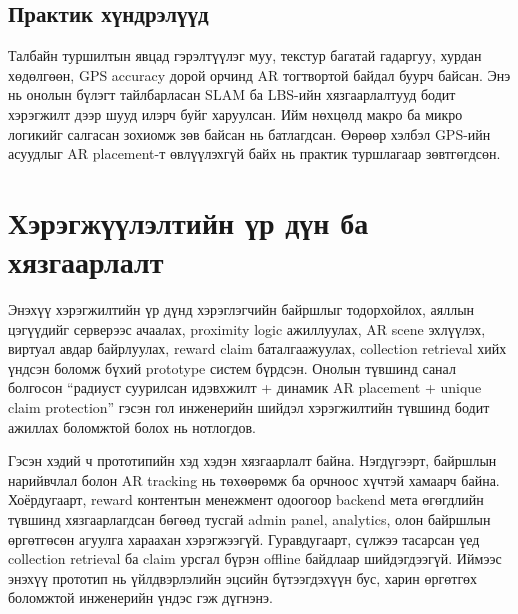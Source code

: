 \begin{sloppy}
\subsection{Практик хүндрэлүүд}

Талбайн туршилтын явцад гэрэлтүүлэг муу, текстур багатай гадаргуу, хурдан хөдөлгөөн, GPS accuracy дорой орчинд AR тогтвортой байдал буурч байсан. Энэ нь онолын бүлэгт тайлбарласан SLAM ба LBS-ийн хязгаарлалтууд бодит хэрэгжилт дээр шууд илэрч буйг харуулсан. Ийм нөхцөлд макро ба микро логикийг салгасан зохиомж зөв байсан нь батлагдсан. Өөрөөр хэлбэл GPS-ийн асуудлыг AR placement-т өвлүүлэхгүй байх нь практик туршлагаар зөвтгөгдсөн.

\section{Хэрэгжүүлэлтийн үр дүн ба хязгаарлалт}

Энэхүү хэрэгжилтийн үр дүнд хэрэглэгчийн байршлыг тодорхойлох, аяллын цэгүүдийг серверээс ачаалах, proximity logic ажиллуулах, AR scene эхлүүлэх, виртуал авдар байрлуулах, reward claim баталгаажуулах, collection retrieval хийх үндсэн боломж бүхий prototype систем бүрдсэн. Онолын түвшинд санал болгосон ``радиуст суурилсан идэвхжилт + динамик AR placement + unique claim protection'' гэсэн гол инженерийн шийдэл хэрэгжилтийн түвшинд бодит ажиллах боломжтой болох нь нотлогдов.

Гэсэн хэдий ч прототипийн хэд хэдэн хязгаарлалт байна. Нэгдүгээрт, байршлын нарийвчлал болон AR tracking нь төхөөрөмж ба орчноос хүчтэй хамаарч байна. Хоёрдугаарт, reward контентын менежмент одоогоор backend мета өгөгдлийн түвшинд хязгаарлагдсан бөгөөд тусгай admin panel, analytics, олон байршлын өргөтгөсөн агуулга хараахан хэрэгжээгүй. Гуравдугаарт, сүлжээ тасарсан үед collection retrieval ба claim урсгал бүрэн offline байдлаар шийдэгдээгүй. Иймээс энэхүү прототип нь үйлдвэрлэлийн эцсийн бүтээгдэхүүн бус, харин өргөтгөх боломжтой инженерийн үндэс гэж дүгнэнэ.

\end{sloppy}
